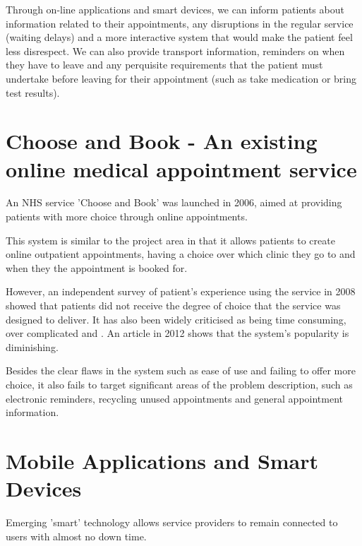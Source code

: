 Through on-line applications and smart devices, we can inform patients about information related to their appointments, any disruptions in the regular service (waiting delays) and a more interactive system that would make the patient feel less disrespect. We can also provide transport information, reminders on when they have to leave and any perquisite requirements that the patient must undertake before leaving for their appointment (such as take medication or bring test results).


\section{Choose and Book - An existing online medical appointment service}

An NHS service 'Choose and Book' was launched in 2006, aimed at providing patients with more choice through online appointments\cite{Walford}.

This system is similar to the project area in that it allows patients to create online outpatient appointments, having a choice over which clinic they go to and when they the appointment is booked for.

However, an independent survey of patient's experience using the service in 2008 showed that patients did not receive the degree of choice that the service was designed to deliver\cite{Green}. It has also been widely criticised as being time consuming, over complicated and . An article in 2012\cite{C&BFailure} shows that the system's popularity is diminishing.

Besides the clear flaws in the system such as ease of use and failing to offer more choice, it also fails to target significant areas of the problem description, such as electronic reminders, recycling unused appointments and general appointment information.


\section{Mobile Applications and Smart Devices}

Emerging 'smart' technology allows service providers to remain connected to users with almost no down time.


